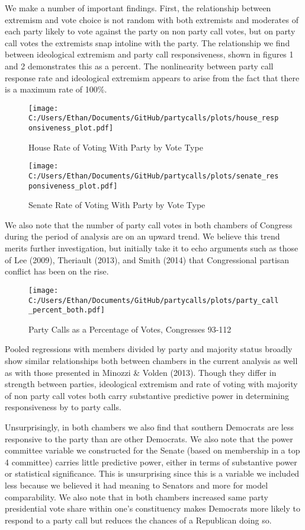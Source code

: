 \documentclass[12pt]{article}
\begin{document}
We make a number of important findings. First, the relationship between extremism and vote choice is not random with both extremists and moderates of each party likely to vote against the party on non party call votes, but on party call votes the extremists snap intoline with the party. The relationship we find between ideological extremism and party call responsiveness, shown in figures 1 and 2 demonstrates this as a percent. The nonlinearity between party call response rate and ideological extremism appears to arise from the fact that there is a maximum rate of 100\%.

\begin{figure}[H]
	\centering
	\caption{House Rate of Voting With Party by Vote Type}
	\texttt{[image: C:/Users/Ethan/Documents/GitHub/partycalls/plots/house\_responsiveness\_plot.pdf]}
\end{figure}

\begin{figure}[H]
	\centering
	\caption{Senate Rate of Voting With Party by Vote Type}
	\texttt{[image: C:/Users/Ethan/Documents/GitHub/partycalls/plots/senate\_responsiveness\_plot.pdf]}
\end{figure}

We also note that the number of party call votes in both chambers of Congress during the period of analysis are on an upward trend. We believe this trend merits further investigation, but initially take it to echo arguments such as those of Lee (2009), Theriault (2013), and Smith (2014) that Congressional partisan conflict has been on the rise. 

\begin{figure}[H]
	\centering
	\caption{Party Calls as a Percentage of Votes, Congresses 93-112}
	\texttt{[image: C:/Users/Ethan/Documents/GitHub/partycalls/plots/party\_call\_percent\_both.pdf]}
\end{figure}

Pooled regressions with members divided by party and majority status broadly show similar relationships both between chambers in the current analysis as well as with those presented in Minozzi \& Volden (2013). Though they differ in strength between parties, ideological extremism and rate of voting with majority of non party call votes both carry substantive predictive power in determining responsiveness by to party calls. 

Unsurprisingly, in both chambers we also find that southern Democrats are less responsive to the party than are other Democrats. We also note that the power committee variable we constructed for the Senate (based on membership in a top 4 committee) carries little predictive power, either in terms of substantive power or statistical significance. This is unsurprising since this is a variable we included less because we believed it had meaning to Senators and more for model comparability. We also note that in both chambers increased same party presidential vote share within one's constituency makes Democrats more likely to respond to a party call but reduces the chances of a Republican doing so.
\end{document}
